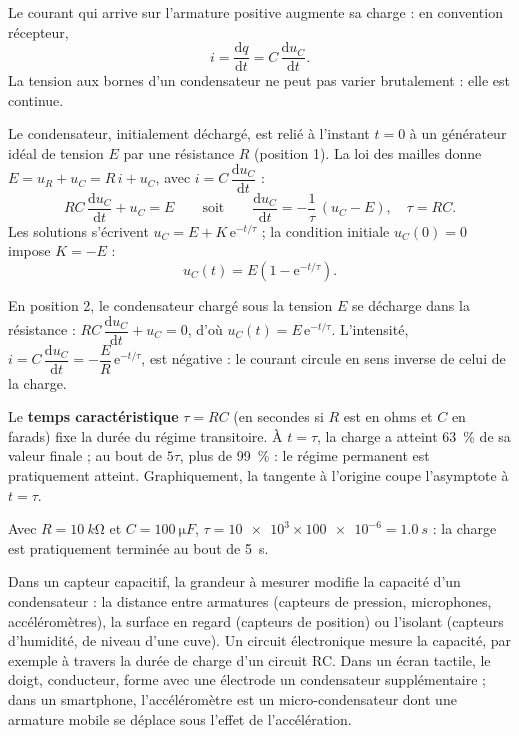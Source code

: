 \begin{propriete}
Le courant qui arrive sur l'armature positive augmente sa charge : en convention récepteur,
\[i=\frac{\mathrm{d}q}{\mathrm{d}t}=C\,\frac{\mathrm{d}u_C}{\mathrm{d}t}.\]
La tension aux bornes d'un condensateur ne peut pas varier brutalement : elle est continue.
\end{propriete}
\begin{savoirfaire}
Le condensateur, initialement déchargé, est relié à l'instant $t=0$ à un générateur idéal de tension $E$ par une
résistance $R$ (position 1). La loi des mailles donne $E=u_R+u_C=R\,i+u_C$, avec $i=C\,\dfrac{\mathrm{d}u_C}{\mathrm{d}t}$ :
\[RC\,\frac{\mathrm{d}u_C}{\mathrm{d}t}+u_C=E\qquad\text{soit}\qquad\frac{\mathrm{d}u_C}{\mathrm{d}t}=-\frac{1}{\tau}\,(u_C-E),\quad\tau=RC.\]
Les solutions s'écrivent $u_C=E+K\,\mathrm{e}^{-t/\tau}$ ; la condition initiale $u_C(0)=0$ impose $K=-E$ :
\[u_C(t)=E\left(1-\mathrm{e}^{-t/\tau}\right).\]
\end{savoirfaire}
\begin{propriete}[Décharge]
En position 2, le condensateur chargé sous la tension $E$ se décharge dans la résistance : $RC\,\dfrac{\mathrm{d}u_C}{\mathrm{d}t}+u_C=0$,
d'où $u_C(t)=E\,\mathrm{e}^{-t/\tau}$. L'intensité, $i=C\,\dfrac{\mathrm{d}u_C}{\mathrm{d}t}=-\dfrac{E}{R}\,\mathrm{e}^{-t/\tau}$, est négative : le courant
circule en sens inverse de celui de la charge.
\end{propriete}
\begin{propriete}
Le \textbf{temps caractéristique} $\tau=RC$ (en secondes si $R$ est en ohms et $C$ en farads) fixe la durée du régime
transitoire. À $t=\tau$, la charge a atteint 63~\% de sa valeur finale ; au bout de $5\tau$, plus de 99~\% : le régime
permanent est pratiquement atteint. Graphiquement, la tangente à l'origine coupe l'asymptote à $t=\tau$.
\end{propriete}
\begin{exemple}
Avec $R=\qty{10}{k\ohm}$ et $C=\qty{100}{\micro F}$, $\tau=\num{10e3}\times\num{100e-6}=\qty{1,0}{s}$ : la charge est pratiquement terminée
au bout de \qty{5}{s}.
\end{exemple}
\begin{propriete}
Dans un capteur capacitif, la grandeur à mesurer modifie la capacité d'un condensateur : la distance entre armatures
(capteurs de pression, microphones, accéléromètres), la surface en regard (capteurs de position) ou l'isolant (capteurs
d'humidité, de niveau d'une cuve). Un circuit électronique mesure la capacité, par exemple à travers la durée de charge
d'un circuit RC. Dans un écran tactile, le doigt, conducteur, forme avec une électrode un condensateur supplémentaire ;
dans un smartphone, l'accéléromètre est un micro-condensateur dont une armature mobile se déplace sous l'effet de
l'accélération.
\end{propriete}
